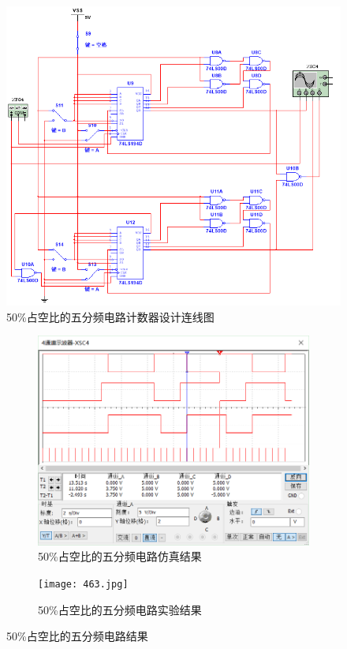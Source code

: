 \documentclass{ctexrep}
\begin{document}
\begin{figure}[htpb]
	\centering
	\includegraphics[width=.8\linewidth]{461.png}
	\caption{50\%占空比的五分频电路计数器设计连线图}
	\label{fig:50占空比的五分频电路计数器设计连线图}
\end{figure}

\begin{figure}[htpb]
	\centering
	\begin{subfigure}[htpb]{.45\linewidth}
		\centering
		\includegraphics[width=\linewidth]{462.png}
		\caption{50\%占空比的五分频电路仿真结果}
		\label{fig:50占空比的五分频电路仿真结果}
	\end{subfigure}
	\quad
	\begin{subfigure}[htpb]{.45\linewidth}
		\centering
		\texttt{[image: 463.jpg]}
		\caption{50\%占空比的五分频电路实验结果}
		\label{fig:50占空比的五分频电路实验结果}
	\end{subfigure}
	\caption{50\%占空比的五分频电路结果}
	\label{fig:50占空比的五分频电路结果}
\end{figure}
\end{document}
